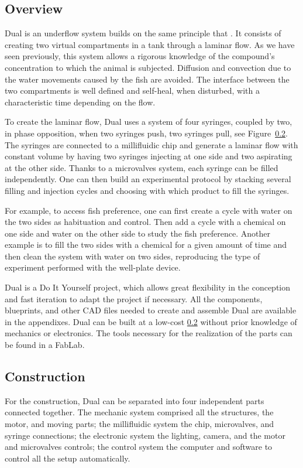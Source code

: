   \subsection{Overview}
  Dual is an underflow system builds on the same principle that \cite{readman2013fish}. It consists of creating two virtual compartments in a tank through a laminar flow. As we have seen previously, this system allows a rigorous knowledge of the compound's concentration to which the animal is subjected. Diffusion and convection due to the water movements caused by the fish are avoided. The interface between the two compartments is well defined and self-heal, when disturbed, with a characteristic time depending on the flow.

  To create the laminar flow, Dual uses a system of four syringes, coupled by two, in phase opposition, when two syringes push, two syringes pull, see Figure~\ref{}. The syringes are connected to a millifluidic chip and generate a laminar flow with constant volume by having two syringes injecting at one side and two aspirating at the other side. Thanks to a microvalves system, each syringe can be filled independently. One can then build an experimental protocol by stacking several filling and injection cycles and choosing with which product to fill the syringes.

  For example, to access fish preference, one can first create a cycle with water on the two sides as habituation and control. Then add a cycle with a chemical on one side and water on the other side to study the fish preference. Another example is to fill the two sides with a chemical for a given amount of time and then clean the system with water on two sides, reproducing the type of experiment performed with the well-plate device.

  Dual is a Do It Yourself project, which allows great flexibility in the conception and fast iteration to adapt the project if necessary. All the components, blueprints, and other CAD files needed to create and assemble Dual are available in the appendixes. Dual can be built at a low-cost \ref{} without prior knowledge of mechanics or electronics. The tools necessary for the realization of the parts can be found in a FabLab.

\subsection{Construction}
For the construction, Dual can be separated into four independent parts connected together. The mechanic system comprised all the structures, the motor, and moving parts; the millifluidic system the chip, microvalves, and syringe connections; the electronic system the lighting, camera, and the motor and microvalves controls; the control system the computer and software to control all the setup automatically.

